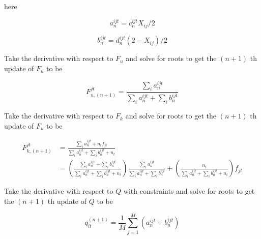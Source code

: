 \documentclass[11pt, DIV10,a4paper]{article}
\begin{document}
here 

$$ a^{ijt}_{n} = c^{ijt}_{n} X_{ij}/2 $$

$$ b^{ijt}_{n} = d^{ijt}_{n} (2 - X_{ij})/2 $$

Take the derivative with respect to $F_u$ and solve for roots  to get the $(n+1)$ th update of $F_u$ to be 

$$ F^{jt}_{u,(n+1)} =  \frac{\sum_i a^{ijt}_n}{\sum_i a^{ijt}_n + \sum_i b^{ijt}_n} $$


Take the derivative with respect to $F_k$ and solve for roots  to get the $(n+1)$ th update of $F_u$ to be 

\begin{align*}
F^{jt}_{k,(n+1)} & =  \frac{\sum_i a^{ijt}_n + n_t  f_{jt}}{\sum_i a^{ijt}_n + \sum_i b^{ijt}_n + n_t} \\
& =   \left ( \frac{\sum_i a^{ijt}_n + \sum_i b^{ijt}_n}{\sum_i a^{ijt}_n + \sum_i b^{ijt}_n+n_t} \right )\frac{\sum_i a^{ijt}_n}{\sum_i a^{ijt}_n + \sum_i b^{ijt}_n} + \left ( \frac{n_t}{ \sum_i a^{ijt}_n + \sum_i b^{ijt}_n+n_t} \right ) f_{jt} 
\end{align*}

Take the derivative with respect to $Q$ with constraints and solve for roots  to get the $(n+1)$ th update of $Q$ to be 

$$ q^{(n+1)}_{it} = \frac{1}{M} \sum_{j=1}^{M} \left ( a^{ijt}_{n} + b^{ijt}_{n} \right ) $$
\end{document}

